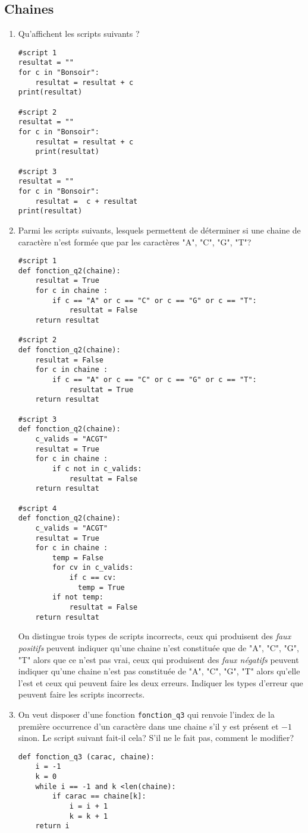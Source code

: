 \subsection{Chaines}
\begin{enumerate}
  \item 
Qu'affichent les scripts suivants ?
\begin{verbatim}
#script 1
resultat = ""
for c in "Bonsoir":
    resultat = resultat + c
print(resultat)

#script 2
resultat = ""
for c in "Bonsoir":
    resultat = resultat + c
    print(resultat)
    
#script 3
resultat = ""
for c in "Bonsoir":
    resultat =  c + resultat
print(resultat)
\end{verbatim}
\item Parmi les scripts suivants, lesquels permettent de déterminer si une chaine de caractère n'est formée que par les caractères "A", "C", "G", "T"?
\begin{verbatim}
#script 1
def fonction_q2(chaine):
    resultat = True
    for c in chaine :
        if c == "A" or c == "C" or c == "G" or c == "T":
            resultat = False
    return resultat

#script 2
def fonction_q2(chaine):
    resultat = False
    for c in chaine :
        if c == "A" or c == "C" or c == "G" or c == "T":
            resultat = True
    return resultat

#script 3
def fonction_q2(chaine):
    c_valids = "ACGT"
    resultat = True
    for c in chaine :
        if c not in c_valids:
            resultat = False
    return resultat

#script 4
def fonction_q2(chaine):
    c_valids = "ACGT"
    resultat = True
    for c in chaine :
        temp = False
        for cv in c_valids:
            if c == cv:
              temp = True
        if not temp:
            resultat = False
    return resultat
\end{verbatim}
On distingue trois types de scripts incorrects, ceux qui produisent des \emph{faux positifs} peuvent indiquer qu'une chaine n'est constituée que de "A", "C", "G", "T" alors que ce n'est pas vrai, ceux qui produisent des \emph{faux négatifs} peuvent indiquer qu'une chaine n'est pas constituée de "A", "C", "G", "T" alors qu'elle l'est et ceux qui peuvent faire les deux erreurs.\newline
Indiquer les types d'erreur que peuvent faire les scripts incorrects.

\item On veut disposer d'une fonction \verb|fonction_q3| qui renvoie l'index de la première occurrence d'un caractère dans une chaine s'il y est présent et $-1$ sinon. Le script suivant fait-il cela? S'il ne le fait pas, comment le modifier?
\begin{verbatim}
def fonction_q3 (carac, chaine):
    i = -1
    k = 0
    while i == -1 and k <len(chaine):
        if carac == chaine[k]:
            i = i + 1
            k = k + 1
    return i
\end{verbatim}
\end{enumerate}

